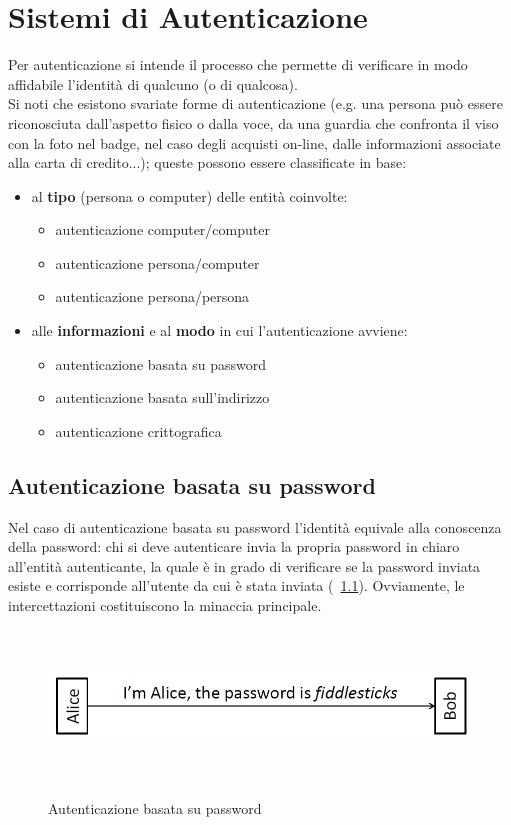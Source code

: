 \chapter{Sistemi di Autenticazione}

Per autenticazione si intende il processo che permette di verificare in modo affidabile l'identità di qualcuno (o di qualcosa).\\
Si noti che esistono svariate forme di autenticazione (e.g. una persona può essere riconosciuta dall'aspetto fisico o dalla voce, da una guardia che confronta il viso con la foto nel badge, nel caso degli acquisti on-line, dalle informazioni associate alla carta di credito...); queste possono essere classificate in base:
\begin{itemize}
\item al \textbf{tipo} (persona o computer) delle entità coinvolte: 
\begin{itemize}
	\item autenticazione computer/computer
	\item autenticazione persona/computer
	\item autenticazione persona/persona
\end{itemize}
\item alle \textbf{informazioni} e al \textbf{modo} in cui l'autenticazione avviene:
\begin{itemize}
	\item autenticazione basata su password
	\item autenticazione basata sull'indirizzo
	\item autenticazione crittografica
\end{itemize} 
\end{itemize}

\section{Autenticazione basata su password}
Nel caso di autenticazione basata su password l'identità equivale alla conoscenza della password: chi si deve autenticare invia la propria password in chiaro all'entità autenticante, la quale è in grado di verificare se la password inviata esiste e corrisponde all'utente da cui è stata inviata (\figurename~\ref{fig:ImgS5}). Ovviamente, le intercettazioni costituiscono la minaccia principale.\\
\begin{figure}[htbp]
	\centering%
	\subfigure%
	{\includegraphics[height=4cm, width=12cm, keepaspectratio]{Immagini/autenticazione/ImgS5.png}}
	\caption{Autenticazione basata su password\label{fig:ImgS5}} 	
\end{figure}

